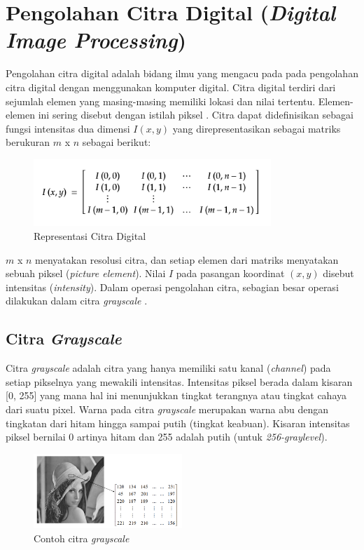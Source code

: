\section{Pengolahan Citra Digital (\emph{Digital Image Processing})}
Pengolahan citra digital adalah bidang ilmu yang mengacu pada pada pengolahan citra digital dengan menggunakan komputer digital. Citra digital terdiri dari sejumlah elemen yang masing-masing memiliki lokasi dan nilai tertentu. Elemen-elemen ini sering disebut dengan istilah piksel \citep{gonzalez2002digital}.
Citra dapat didefinisikan sebagai fungsi intensitas dua dimensi $I(x,y)$ yang direpresentasikan sebagai matriks berukuran $m$ x $n$ sebagai berikut:
\begin{figure}[H]
	\centering
	\includegraphics[width=0.8\textwidth]{gambar/image_intensity}
	\caption{Representasi Citra Digital}
	\label{Gambar:imageintensity}
\end{figure}
$m$ x $n$ menyatakan resolusi citra, dan setiap elemen dari matriks menyatakan sebuah piksel (\emph{picture element}). Nilai $I$ pada pasangan koordinat $(x,y)$ disebut intensitas (\emph{intensity}). Dalam operasi pengolahan citra, sebagian besar operasi dilakukan dalam citra \emph{grayscale} \citep{tyagi2018understanding}.

\subsection{Citra \emph{Grayscale}}
Citra \emph{grayscale} adalah citra yang hanya memiliki satu kanal (\emph{channel}) pada setiap pikselnya yang mewakili intensitas. Intensitas piksel berada dalam kisaran [0, 255] yang mana hal ini menunjukkan tingkat terangnya atau tingkat cahaya dari suatu pixel. Warna pada citra \emph{grayscale} merupakan warna abu dengan tingkatan dari hitam hingga sampai putih (tingkat keabuan). Kisaran intensitas piksel bernilai 0 artinya hitam dan 255 adalah putih (untuk \emph{256-graylevel}).
\begin{figure}[H]
	\centering
	\includegraphics[width=0.5\textwidth]{gambar/grayimage}
	\caption{Contoh citra \emph{grayscale}}
	\label{Gambar:grayimage}
\end{figure}

